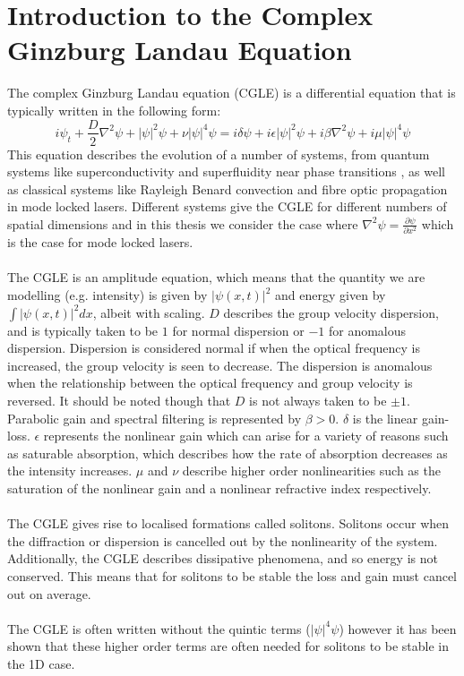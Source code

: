 \documentclass[a4paper,12pt]{report}
\begin{document}
\chapter{Introduction to the Complex Ginzburg Landau Equation}
The complex Ginzburg Landau equation (CGLE) is a differential equation that is typically written in the following form: 
$$i\psi_t +\frac{D}{2}\nabla^2\psi+|\psi|^2\psi +\nu |\psi|^4\psi = i\delta \psi+i\epsilon|\psi|^2\psi +i\beta\nabla^2\psi+i\mu|\psi|^4\psi$$
This equation describes the evolution of a number of systems, from quantum systems like superconductivity and superfluidity near phase transitions \cite{annett}, as well as classical systems like Rayleigh Benard convection\cite{wocgle} and fibre optic propagation in mode locked lasers\cite{2001}. Different systems give the CGLE for different numbers of spatial dimensions and in this thesis we consider the case where $\nabla^2\psi=\frac{\partial \psi}{\partial x^2}$ which is the case for mode locked lasers. 
\\\\
The CGLE is an amplitude equation, which means that the quantity we are modelling (e.g. intensity) is given by $|\psi(x,t)|^2$ and energy given by $\int|\psi(x,t)|^2 dx$, albeit with scaling. 
$D$ describes the group velocity dispersion, and is typically taken to be $1$ for normal dispersion or $-1$ for anomalous dispersion. Dispersion is considered normal if when the optical frequency is increased, the group velocity is seen to decrease. The dispersion is anomalous when the relationship between the optical frequency and group velocity is reversed. It should be noted though that $D$ is not always taken to be $\pm1$\cite{spiny,spike}. 
Parabolic gain and spectral filtering is represented by $\beta>0$. 
$\delta$ is the linear gain-loss. 
$\epsilon$ represents the nonlinear gain which can arise for a variety of reasons such as saturable absorption, which describes how the rate of absorption decreases as the  intensity increases.
$\mu$ and $\nu$ describe higher order nonlinearities such as the saturation of the nonlinear gain and a nonlinear refractive index respectively. \cite{2001}
\\\\
The CGLE gives rise to localised formations called solitons. Solitons occur when the diffraction or dispersion is cancelled out by the nonlinearity of the system. Additionally, the CGLE describes dissipative phenomena, and so energy is not conserved. This means that for solitons to be stable the loss and gain must cancel out on average. \cite{dissys}
\\\\
The CGLE is often written without the quintic terms ($|\psi|^4\psi$) however it has been shown that these higher order terms are often needed for solitons to be stable in the 1D case. \cite{5th}
\end{document}

